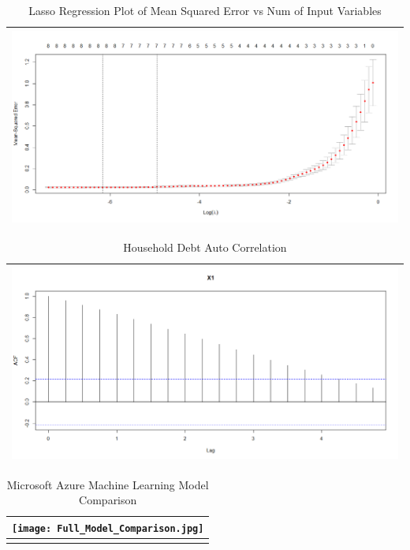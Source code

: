 \documentclass[sigconf,nonacm,11pt]{acmart}
\begin{document}
\begin{appendix}
\begin{table}[ht]
\caption{Lasso Regression Plot of Mean Squared Error vs Num of Input Variables}
\centering
\begin{tabular}{p{1.0\linewidth}}
\hline
\includegraphics[scale = 0.26]{LASSORegression_Plot.png}\\
\hline
\end{tabular}
\end{table}

\begin{table}[ht]
\caption{Household Debt Auto Correlation}
\centering
\begin{tabular}{p{1.0\linewidth}}
\hline
\includegraphics[scale = 0.26]{HouseholdDebtAutoCor.png}\\
\hline
\end{tabular}
\end{table}



\begin{table}[ht]
\caption{Microsoft Azure Machine Learning Model Comparison}
\centering
\begin{tabular}{p{1.0\linewidth}}
\hline
\texttt{[image: Full\_Model\_Comparison.jpg]}\\
\hline\\
\end{tabular}
\end{table}


\end{appendix}
\end{document}
